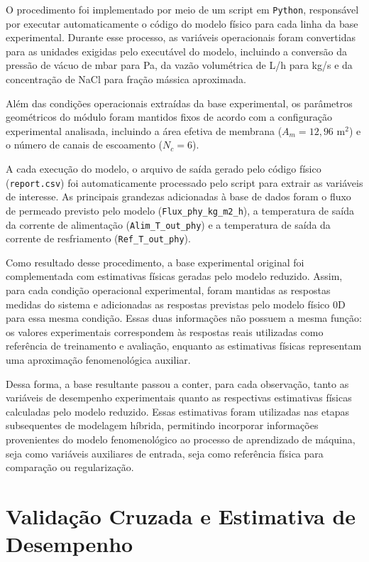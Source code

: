 O procedimento foi implementado por meio de um script em \texttt{Python}, responsável por executar automaticamente o código do modelo físico para cada linha da base experimental. Durante esse processo, as variáveis operacionais foram convertidas para as unidades exigidas pelo executável do modelo, incluindo a conversão da pressão de vácuo de mbar para Pa, da vazão volumétrica de L/h para kg/s e da concentração de NaCl para fração mássica aproximada.

Além das condições operacionais extraídas da base experimental, os parâmetros geométricos do módulo foram mantidos fixos de acordo com a configuração experimental analisada, incluindo a área efetiva de membrana ($A_m = 12{,}96$ m$^2$) e o número de canais de escoamento ($N_c = 6$).

A cada execução do modelo, o arquivo de saída gerado pelo código físico (\texttt{report.csv}) foi automaticamente processado pelo script para extrair as variáveis de interesse. As principais grandezas adicionadas à base de dados foram o fluxo de permeado previsto pelo modelo (\texttt{Flux\_phy\_kg\_m2\_h}), a temperatura de saída da corrente de alimentação (\texttt{Alim\_T\_out\_phy}) e a temperatura de saída da corrente de resfriamento (\texttt{Ref\_T\_out\_phy}). 

Como resultado desse procedimento, a base experimental original foi complementada com estimativas físicas geradas pelo modelo reduzido. Assim, para cada condição operacional experimental, foram mantidas as respostas medidas do sistema e adicionadas as respostas previstas pelo modelo físico 0D para essa mesma condição. Essas duas informações não possuem a mesma função: os valores experimentais correspondem às respostas reais utilizadas como referência de treinamento e avaliação, enquanto as estimativas físicas representam uma aproximação fenomenológica auxiliar.

Dessa forma, a base resultante passou a conter, para cada observação, tanto as variáveis de desempenho experimentais quanto as respectivas estimativas físicas calculadas pelo modelo reduzido. Essas estimativas foram utilizadas nas etapas subsequentes de modelagem híbrida, permitindo incorporar informações provenientes do modelo fenomenológico ao processo de aprendizado de máquina, seja como variáveis auxiliares de entrada, seja como referência física para comparação ou regularização.

\section{Validação Cruzada e Estimativa de Desempenho}

